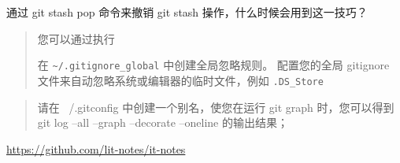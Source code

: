 \documentclass{../../../latex/lcm}
\begin{document}
通过 git stash pop 命令来撤销 git stash 操作，什么时候会用到这一技巧？



\begin{quote}
您可以通过执行


在 \verb|~/.gitignore_global| 中创建全局忽略规则。
配置您的全局 gitignore 文件来自动忽略系统或编辑器的临时文件，例如 \verb|.DS_Store|
\end{quote}




\begin{quote}
请在 ~/.gitconfig 中创建一个别名，使您在运行 git graph 时，您可以得到 git log --all --graph --decorate --oneline 的输出结果；
\end{quote}


\url{https://github.com/lit-notes/it-notes}



\end{document}
